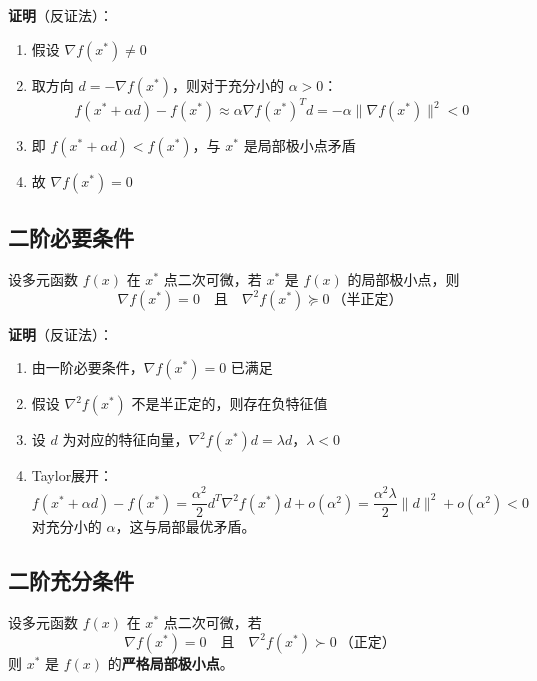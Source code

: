 \textbf{证明}（反证法）：
\begin{enumerate}[label=Step \arabic*:, leftmargin=2em]
    \item 假设 $\nabla f(x^*) \neq 0$
    \item 取方向 $d = -\nabla f(x^*)$，则对于充分小的 $\alpha > 0$：
    \[
    f(x^* + \alpha d) - f(x^*) \approx \alpha \nabla f(x^*)^T d = -\alpha \|\nabla f(x^*)\|^2 < 0
    \]
    \item 即 $f(x^* + \alpha d) < f(x^*)$，与 $x^*$ 是局部极小点矛盾
    \item 故 $\nabla f(x^*) = 0$
\end{enumerate}

\subsection{二阶必要条件}

\begin{theorem}[二阶必要条件]\label{thm:second-order-necessary}
设多元函数 $f(x)$ 在 $x^*$ 点二次可微，若 $x^*$ 是 $f(x)$ 的局部极小点，则
\[
\nabla f(x^*) = 0 \quad \text{且} \quad \nabla^2 f(x^*) \succeq 0 \ \text{（半正定）}
\]
\end{theorem}

\textbf{证明}（反证法）：
\begin{enumerate}[label=Step \arabic*:, leftmargin=2em]
    \item 由一阶必要条件，$\nabla f(x^*) = 0$ 已满足
    \item 假设 $\nabla^2 f(x^*)$ 不是半正定的，则存在负特征值
    \item 设 $d$ 为对应的特征向量，$\nabla^2 f(x^*) d = \lambda d$，$\lambda < 0$
    \item Taylor展开：
    \[
    f(x^* + \alpha d) - f(x^*) = \frac{\alpha^2}{2} d^T \nabla^2 f(x^*) d + o(\alpha^2) = \frac{\alpha^2 \lambda}{2} \|d\|^2 + o(\alpha^2) < 0
    \]
    对充分小的 $\alpha$，这与局部最优矛盾。
\end{enumerate}

\subsection{二阶充分条件}

\begin{theorem}[二阶充分条件 1]\label{thm:second-order-sufficient1}
设多元函数 $f(x)$ 在 $x^*$ 点二次可微，若
\[
\nabla f(x^*) = 0 \quad \text{且} \quad \nabla^2 f(x^*) \succ 0 \ \text{（正定）}
\]
则 $x^*$ 是 $f(x)$ 的\textbf{严格局部极小点}。
\end{theorem}

